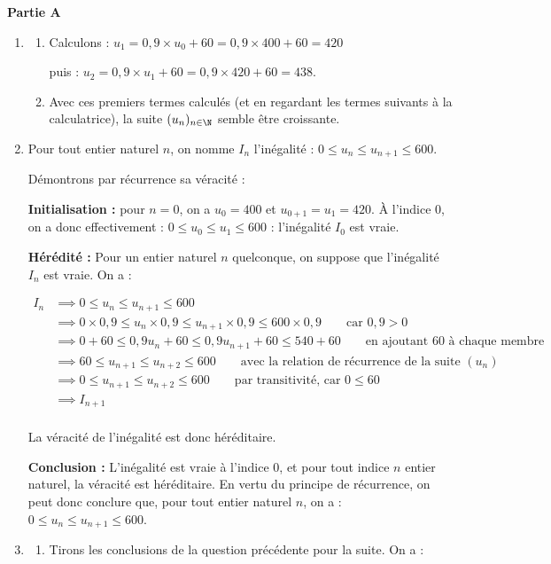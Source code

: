 \medskip

	\textbf{Partie A}

	\medskip


	\begin{enumerate}
	\item \begin{enumerate}
		\item Calculons : $u_1 = 0,9 \times u_0 + 60 = 0,9\times 400 + 60 = 420$

		puis : $u_2= 0,9 \times u_1 + 60 = 0,9\times 420 + 60 = 438$.
		\item Avec ces premiers termes calculés (et en regardant les termes suivants à la calculatrice), la suite $(u_n)_{n \in \N}$ semble être croissante.
		\end{enumerate}
	\item Pour tout entier naturel $n$, on nomme $I_n$ l'inégalité : \quad $0  \leqslant u_n  \leqslant u_{n+1} \leqslant  600$.

	Démontrons par récurrence sa véracité :

	\textbf{Initialisation :} pour $n = 0$, on a $u_0 = 400$ et $u_{0+1} = u_1 = 420$. À l'indice 0, on a donc effectivement : $0\leqslant u_0 \leqslant u_1 \leqslant 600 $ : l'inégalité $I_0$ est vraie.

	\smallskip
	\textbf{Hérédité :} Pour un entier naturel $n$ quelconque, on suppose que l'inégalité $I_n$ est vraie. On a :

$\begin{aligned} I_n &\implies 0  \leqslant u_n  \leqslant u_{n+1} \leqslant  600\\
		&\implies 0\times 0,9  \leqslant u_n \times 0,9 \leqslant u_{n+1}\times 0,9 \leqslant  600\times 0,9 \qquad \text{car }0,9>0\\
		&\implies 0 + 60  \leqslant 0,9u_n + 60 \leqslant 0,9u_{n+1} + 60 \leqslant  540 + 60 \qquad \text{en ajoutant 60 à chaque membre}\\
		&\implies 60 \leqslant u_{n + 1} \leqslant u_{n+2} \leqslant  600 \qquad \text{avec la relation de récurrence de la suite } (u_n)\\
		&\implies 0 \leqslant u_{n + 1} \leqslant u_{n+2} \leqslant  600 \qquad \text{par transitivité, car } 0 \leqslant 60\\
		&\implies I_{n+1} \\ \end{aligned} $

La véracité de l'inégalité est donc héréditaire.

\textbf{Conclusion :} L'inégalité est vraie à l'indice 0, et pour tout indice $n$ entier naturel, la véracité est héréditaire. En vertu du principe de récurrence, on peut donc conclure que, pour tout entier naturel $n$, on a : \quad $0  \leqslant u_n  \leqslant u_{n+1} \leqslant  600$.
	\item
		\begin{enumerate}
			\item Tirons les conclusions de la question précédente pour la suite. On a :


\end{enumerate}
\end{enumerate}
